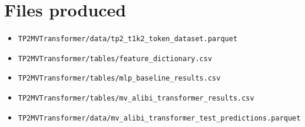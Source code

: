 \documentclass[11pt]{article}
\begin{document}
\section{Files produced}
\begin{itemize}
    \item \texttt{TP2MVTransformer/data/tp2\_t1k2\_token\_dataset.parquet}
    \item \texttt{TP2MVTransformer/tables/feature\_dictionary.csv}
    \item \texttt{TP2MVTransformer/tables/mlp\_baseline\_results.csv}
    \item \texttt{TP2MVTransformer/tables/mv\_alibi\_transformer\_results.csv}
    \item \texttt{TP2MVTransformer/data/mv\_alibi\_transformer\_test\_predictions.parquet}
\end{itemize}
\end{document}
